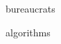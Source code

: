 \documentclass[presentation]{subfiles}
\begin{document}
\begin{frame}[t]

\vspace{4em}

\begin{columns}

\begin{column}{0.16\textwidth}

\vspace{-0em}

bureaucrats

\vspace{4em}

algorithms
\end{column}


\begin{column}{0.16\textwidth}
  

\end{column}
\end{columns}
\end{frame}
\end{document}
